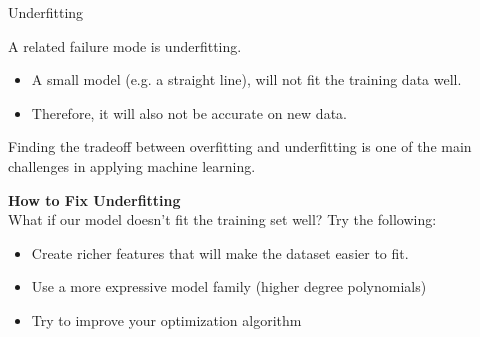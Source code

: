 \documentclass[../../main.tex]{subfiles}
\begin{document}
\begin{frame}{Underfitting}

A related failure mode is underfitting.
 \begin{itemize}
     \item A small model (e.g. a straight line), will not fit the training data well.
 \end{itemize}
 \begin{itemize}
     \item Therefore, it will also not be accurate on new data.
 \end{itemize} 

Finding the tradeoff between overfitting and underfitting is one of the main challenges in applying machine learning.

\vspace{0.5cm}
\textbf{How to Fix Underfitting} \\
What if our model doesn't fit the training set well? Try the following:

     \begin{itemize}
         \item Create richer features that will make the dataset easier to fit.
     \end{itemize}
 
     \begin{itemize}
         \item Use a more expressive model family (higher degree polynomials) 
     \end{itemize}

      \begin{itemize}
          \item Try to improve your optimization algorithm
      \end{itemize}


\end{frame}
\end{document}
